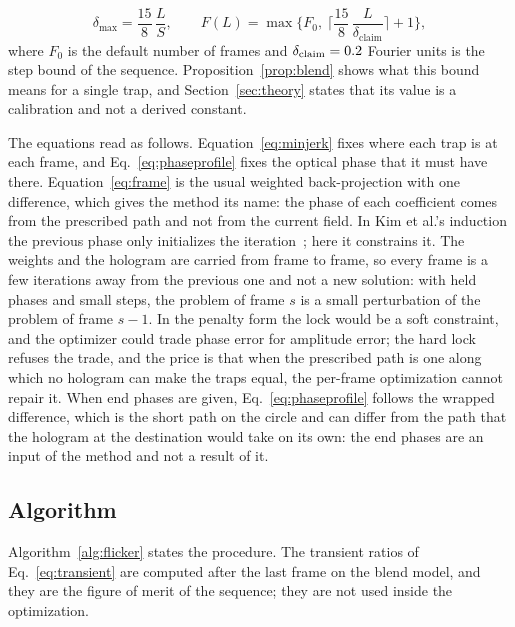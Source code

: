 \begin{equation}
\delta_{\max}=\frac{15}{8}\,\frac{L}{S},\qquad F(L)=\max\Big\{F_0,\ \Big\lceil\frac{15}{8}\,\frac{L}{\delta_{\mathrm{claim}}}\Big\rceil+1\Big\},\label{eq:frames}
\end{equation}
where $F_0$ is the default number of frames and $\delta_{\mathrm{claim}}=0.2{}$ Fourier units is the step bound of the sequence. Proposition~\ref{prop:blend} shows what this bound means for a single trap, and Section~\ref{sec:theory} states that its value is a calibration and not a derived constant.

The equations read as follows. Equation~\ref{eq:minjerk} fixes where each trap is at each frame, and Eq.~\ref{eq:phaseprofile} fixes the optical phase that it must have there. Equation~\ref{eq:frame} is the usual weighted back-projection with one difference, which gives the method its name: the phase of each coefficient comes from the prescribed path and not from the current field. In Kim et al.'s induction the previous phase only initializes the iteration~\cite{kimoe}; here it constrains it. The weights and the hologram are carried from frame to frame, so every frame is a few iterations away from the previous one and not a new solution: with held phases and small steps, the problem of frame $s$ is a small perturbation of the problem of frame $s-1$. In the penalty form the lock would be a soft constraint, and the optimizer could trade phase error for amplitude error; the hard lock refuses the trade, and the price is that when the prescribed path is one along which no hologram can make the traps equal, the per-frame optimization cannot repair it. When end phases are given, Eq.~\ref{eq:phaseprofile} follows the wrapped difference, which is the short path on the circle and can differ from the path that the hologram at the destination would take on its own: the end phases are an input of the method and not a result of it.

\subsection{Algorithm}

Algorithm~\ref{alg:flicker} states the procedure. The transient ratios of Eq.~\ref{eq:transient} are computed after the last frame on the blend model, and they are the figure of merit of the sequence; they are not used inside the optimization.

